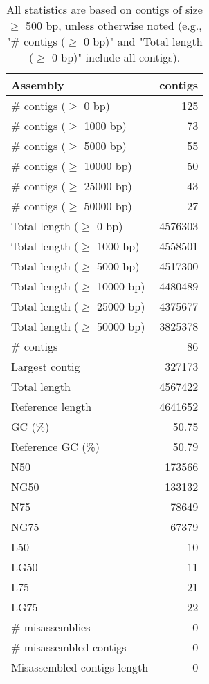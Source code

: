 \documentclass[12pt,a4paper]{article}
\begin{document}
\begin{table}[ht]
\begin{center}
\caption{All statistics are based on contigs of size $\geq$ 500 bp, unless otherwise noted (e.g., "\# contigs ($\geq$ 0 bp)" and "Total length ($\geq$ 0 bp)" include all contigs).}
\begin{tabular}{|l*{1}{|r}|}
\hline
Assembly & contigs \\ \hline
\# contigs ($\geq$ 0 bp) & 125 \\ \hline
\# contigs ($\geq$ 1000 bp) & 73 \\ \hline
\# contigs ($\geq$ 5000 bp) & 55 \\ \hline
\# contigs ($\geq$ 10000 bp) & 50 \\ \hline
\# contigs ($\geq$ 25000 bp) & 43 \\ \hline
\# contigs ($\geq$ 50000 bp) & 27 \\ \hline
Total length ($\geq$ 0 bp) & 4576303 \\ \hline
Total length ($\geq$ 1000 bp) & 4558501 \\ \hline
Total length ($\geq$ 5000 bp) & 4517300 \\ \hline
Total length ($\geq$ 10000 bp) & 4480489 \\ \hline
Total length ($\geq$ 25000 bp) & 4375677 \\ \hline
Total length ($\geq$ 50000 bp) & 3825378 \\ \hline
\# contigs & 86 \\ \hline
Largest contig & 327173 \\ \hline
Total length & 4567422 \\ \hline
Reference length & 4641652 \\ \hline
GC (\%) & 50.75 \\ \hline
Reference GC (\%) & 50.79 \\ \hline
N50 & 173566 \\ \hline
NG50 & 133132 \\ \hline
N75 & 78649 \\ \hline
NG75 & 67379 \\ \hline
L50 & 10 \\ \hline
LG50 & 11 \\ \hline
L75 & 21 \\ \hline
LG75 & 22 \\ \hline
\# misassemblies & 0 \\ \hline
\# misassembled contigs & 0 \\ \hline
Misassembled contigs length & 0 \\ \hline

\end{tabular}
\end{center}
\end{table}
\end{document}
